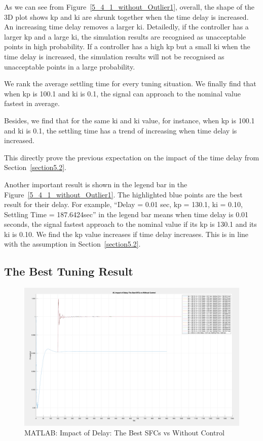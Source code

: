 As we can see from Figure~\ref{5_4_1_without_Outlier1}, overall, the shape of the 3D plot shows kp and ki are shrunk together when the time delay is increased. An increasing time delay removes a larger ki. Detailedly, if the controller has a larger kp and a large ki, the simulation results are recognised as unacceptable points in high probability. If a controller has a high kp but a small ki when the time delay is increased, the simulation results will not be recognised as unacceptable points in a large probability. 

We rank the average settling time for every tuning situation. We finally find that when kp is 100.1 and ki is 0.1, the signal can approach to the nominal value fastest in average. 

Besides, we find that for the same ki and ki value, for instance, when kp is 100.1 and ki is 0.1, the settling time has a trend of increasing when time delay is increased.  

This directly prove the previous expectation on the impact of the time delay from Section~\ref{section5.2}.  


Another important result is shown in the legend bar in the Figure~\ref{5_4_1_without_Outlier1}. The highlighted blue points are the best result for their delay. For example, “Delay = 0.01 sec, kp = 130.1, ki = 0.10, Settling Time = 187.6424sec” in the legend bar means when time delay is 0.01 seconds, the signal fastest approach to the nominal value if its kp is 130.1 and its ki is 0.10. We find the kp value increases if time delay increases. This is in line with the assumption in Section~\ref{section5.2}. 

\subsection{The Best Tuning Result} %
\begin{figure}[htbp]
\centering
\includegraphics[width = .819\textwidth]{figure/5_4_2.png}
\caption{MATLAB: Impact of Delay: The Best SFCs vs Without Control}
\label{5_4_2}
\end{figure}